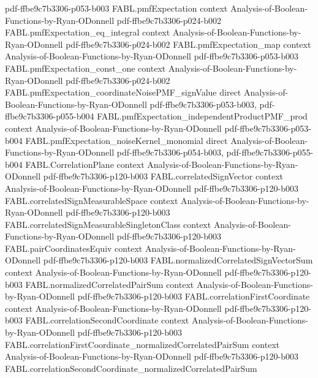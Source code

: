 \begin{theorem}
  {pdf-ffbe9c7b3306-p053-b003}
\proofstep
  {FABL.pmfExpectation}
  {context}
  {Analysis-of-Boolean-Functions-by-Ryan-ODonnell}
  {pdf-ffbe9c7b3306-p024-b002}
\proofstep
  {FABL.pmfExpectation_eq_integral}
  {context}
  {Analysis-of-Boolean-Functions-by-Ryan-ODonnell}
  {pdf-ffbe9c7b3306-p024-b002}
\proofstep
  {FABL.pmfExpectation_map}
  {context}
  {Analysis-of-Boolean-Functions-by-Ryan-ODonnell}
  {pdf-ffbe9c7b3306-p053-b003}
\proofstep
  {FABL.pmfExpectation_const_one}
  {context}
  {Analysis-of-Boolean-Functions-by-Ryan-ODonnell}
  {pdf-ffbe9c7b3306-p024-b002}
\proofstep
  {FABL.pmfExpectation_coordinateNoisePMF_signValue}
  {direct}
  {Analysis-of-Boolean-Functions-by-Ryan-ODonnell}
  {pdf-ffbe9c7b3306-p053-b003,
    pdf-ffbe9c7b3306-p055-b004}
\proofstep
  {FABL.pmfExpectation_independentProductPMF_prod}
  {context}
  {Analysis-of-Boolean-Functions-by-Ryan-ODonnell}
  {pdf-ffbe9c7b3306-p053-b004}
\proofstep
  {FABL.pmfExpectation_noiseKernel_monomial}
  {direct}
  {Analysis-of-Boolean-Functions-by-Ryan-ODonnell}
  {pdf-ffbe9c7b3306-p054-b003,
    pdf-ffbe9c7b3306-p055-b004}
\proofstep
  {FABL.CorrelationPlane}
  {context}
  {Analysis-of-Boolean-Functions-by-Ryan-ODonnell}
  {pdf-ffbe9c7b3306-p120-b003}
\proofstep
  {FABL.correlatedSignVector}
  {context}
  {Analysis-of-Boolean-Functions-by-Ryan-ODonnell}
  {pdf-ffbe9c7b3306-p120-b003}
\proofstep
  {FABL.correlatedSignMeasurableSpace}
  {context}
  {Analysis-of-Boolean-Functions-by-Ryan-ODonnell}
  {pdf-ffbe9c7b3306-p120-b003}
\proofstep
  {FABL.correlatedSignMeasurableSingletonClass}
  {context}
  {Analysis-of-Boolean-Functions-by-Ryan-ODonnell}
  {pdf-ffbe9c7b3306-p120-b003}
\proofstep
  {FABL.pairCoordinatesEquiv}
  {context}
  {Analysis-of-Boolean-Functions-by-Ryan-ODonnell}
  {pdf-ffbe9c7b3306-p120-b003}
\proofstep
  {FABL.normalizedCorrelatedSignVectorSum}
  {context}
  {Analysis-of-Boolean-Functions-by-Ryan-ODonnell}
  {pdf-ffbe9c7b3306-p120-b003}
\proofstep
  {FABL.normalizedCorrelatedPairSum}
  {context}
  {Analysis-of-Boolean-Functions-by-Ryan-ODonnell}
  {pdf-ffbe9c7b3306-p120-b003}
\proofstep
  {FABL.correlationFirstCoordinate}
  {context}
  {Analysis-of-Boolean-Functions-by-Ryan-ODonnell}
  {pdf-ffbe9c7b3306-p120-b003}
\proofstep
  {FABL.correlationSecondCoordinate}
  {context}
  {Analysis-of-Boolean-Functions-by-Ryan-ODonnell}
  {pdf-ffbe9c7b3306-p120-b003}
\proofstep
  {FABL.correlationFirstCoordinate_normalizedCorrelatedPairSum}
  {context}
  {Analysis-of-Boolean-Functions-by-Ryan-ODonnell}
  {pdf-ffbe9c7b3306-p120-b003}
\proofstep
  {FABL.correlationSecondCoordinate_normalizedCorrelatedPairSum}

\end{theorem}
